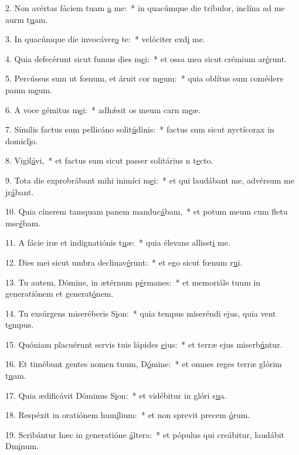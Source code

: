 2. Non avértas fáciem tuam \uline{a} me:~* in quacúmque die tríbulor, inclína ad me aurm t\uline{u}am.\par 
3. In quacúmque die invocáver\uline{o} te:~* velóciter exd\uline{i} me.\par 
4. Quia defecérunt sicut fumus dies m\uline{e}i:~* et ossa mea sicut crémium ar\uline{é}runt.\par 
5. Percússus sum ut fœnum, et áruit cor m\uline{e}um:~* quia oblítus sum comédere panm m\uline{e}um.\par 
6. A voce gémitus m\uline{e}i:~* adhǽsit os meum carn m\uline{e}æ.\par 
7. Símilis factus sum pellicáno solit\uline{ú}dinis:~* factus sum sicut nyctícorax in domicl\uline{i}o.\par 
8. Vigil\uline{á}vi,~* et factus sum sicut passer solitárius n t\uline{e}cto.\par 
9. Tota die exprobrábant mihi inimíci m\uline{e}i:~* et qui laudábant me, advérsum me jr\uline{á}bant.\par 
10. Quia cínerem tamquam panem manduc\uline{á}bam,~* et potum meum cum fletu msc\uline{é}bam.\par 
11. A fácie iræ et indignatiónis t\uline{u}æ:~* quia élevans allisst\uline{i} me.\par 
12. Dies mei sicut umbra declinav\uline{é}runt:~* et ego sicut fœnum r\uline{u}i.\par 
13. Tu autem, Dómine, in ætérnum p\uline{é}rmanes:~* et memoriále tuum in generatiónem et generat\uline{ó}nem.\par 
14. Tu exsúrgens miseréberis S\uline{i}on:~* quia tempus miseréndi ejus, quia vent t\uline{e}mpus.\par 
15. Quóniam placuérunt servis tuis lápides \uline{e}jus:~* et terræ ejus miserb\uline{ú}ntur.\par 
16. Et timébunt gentes nomen tuum, D\uline{ó}mine:~* et omnes reges terræ glórim t\uline{u}am.\par 
17. Quia ædificávit Dóminus S\uline{i}on:~* et vidébitur in glóri s\uline{u}a.\par 
18. Respéxit in oratiónem hum\uline{í}lium:~* et non sprevit precem \uline{ó}rum.\par 
19. Scribántur hæc in generatióne \uline{á}ltera:~* et pópulus qui creábitur, laudábit Dm\uline{i}num.\par 
